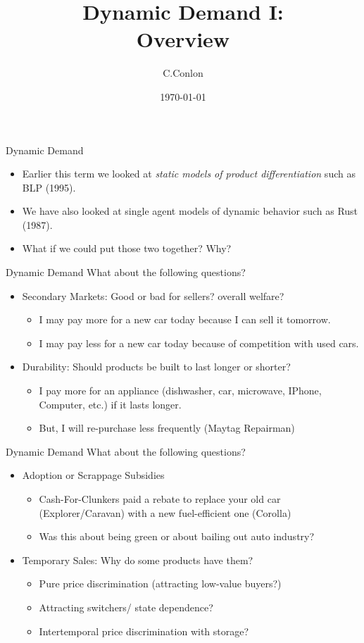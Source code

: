 \documentclass[xcolor=pdftex,dvipsnames,table,mathserif,aspectratio=169]{beamer}
\title [Dynamic Demand I]{Dynamic Demand I:\\
 Overview}
\author{C.Conlon}
\institute{Grad IO}
\date{\today}
\begin{document}
\begin{frame}
\titlepage
\end{frame}


\begin{frame}{Dynamic Demand}
\begin{itemize}
\item Earlier this term we looked at \textit{static models of product differentiation} such as BLP (1995).
\item We have also looked at single agent models of dynamic behavior such as Rust (1987).
\item What if we could put those two together? Why?
\end{itemize}
\end{frame}

\begin{frame}{Dynamic Demand}
What about the following questions?
\begin{itemize}
\item Secondary Markets: Good or bad for sellers? overall welfare?
\begin{itemize}
\item I may pay \alert{more} for a new car today because I can sell it tomorrow.
\item I may pay \alert{less} for a new car today because of competition with used cars.
\end{itemize}
\item Durability: Should products be built to last longer or shorter?
\begin{itemize}
\item I pay \alert{more} for an appliance (dishwasher, car, microwave, IPhone, Computer, etc.) if it 
\alert{lasts longer}.
\item But, I will re-purchase less frequently (Maytag Repairman)
\end{itemize}
\end{itemize}
\end{frame}


\begin{frame}{Dynamic Demand}
What about the following questions?
\begin{itemize}
\item Adoption or Scrappage Subsidies
\begin{itemize}
\item Cash-For-Clunkers paid a rebate to replace your old car (Explorer/Caravan) with a new fuel-efficient one (Corolla)
\item Was this about being green or about bailing out auto industry?
\end{itemize}
\item Temporary Sales: Why do some products have them?
\begin{itemize}
\item Pure price discrimination (attracting low-value buyers?) 
\item Attracting switchers/ state dependence?
\item Intertemporal price discrimination with storage?
\end{itemize}
\end{itemize}
\end{frame}
\end{document}
